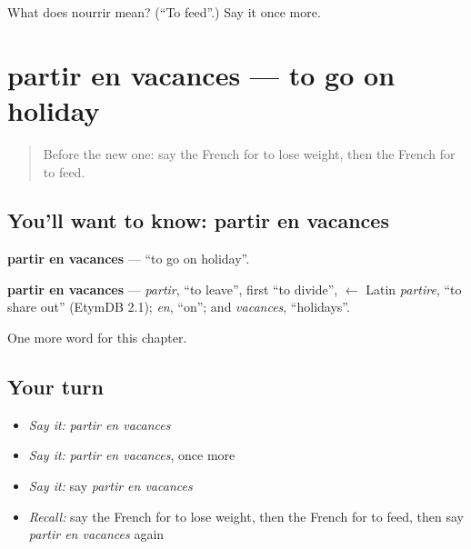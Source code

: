 \begin{tcolorbox}[breakable,colback=teal!4,colframe=teal!35!black,title={Before you move on}]
What does nourrir mean? (\textquotedblleft{}To feed\textquotedblright{}.) Say it once more.
\end{tcolorbox}
\section[partir en vacances]{partir en vacances — to go on holiday}

\label{lesson:FR-C242-partir-en-vacances}



\begin{quote}
Before the new one: say the French for to lose weight, then the French for to feed.
\end{quote}

\subsection*{You'll want to know: partir en vacances}
\textbf{partir en vacances} — \textquotedblleft{}to go on holiday\textquotedblright{}.

\begin{cousinweb}
\textbf{partir en vacances} — \emph{partir}, \textquotedblleft{}to leave\textquotedblright{}, first \textquotedblleft{}to divide\textquotedblright{}, $\leftarrow$ Latin \emph{partire}, \textquotedblleft{}to share out\textquotedblright{} (EtymDB 2.1); \emph{en}, \textquotedblleft{}on\textquotedblright{}; and \emph{vacances}, \textquotedblleft{}holidays\textquotedblright{}.
\end{cousinweb}

\begin{grammarlens}[title={What you've built}]
One more word for this chapter.
\end{grammarlens}

\subsection*{Your turn}
\begin{itemize}
\raggedright
  \item \emph{Say it:} \emph{partir en vacances}
  \item \emph{Say it:} \emph{partir en vacances}, once more
  \item \emph{Say it:} say \emph{partir en vacances}
  \item \emph{Recall:} say the French for to lose weight, then the French for to feed, then say \emph{partir en vacances} again
\end{itemize}

